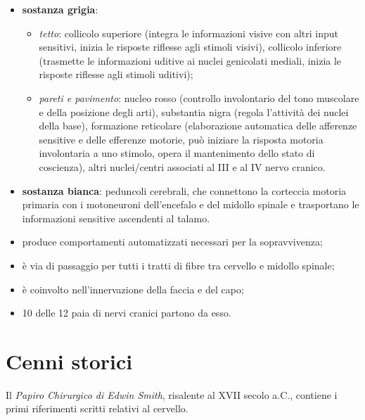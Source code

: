 \begin{itemize}
  \item \textbf{sostanza grigia}:
  \begin{itemize}
    \item \textit{tetto}: collicolo superiore (integra le informazioni
      visive con altri input sensitivi, inizia le risposte riflesse agli
      stimoli visivi), collicolo inferiore (trasmette le informazioni
      uditive ai nuclei genicolati mediali, inizia le risposte riflesse
      agli stimoli uditivi);
    \item \textit{pareti e pavimento}: nucleo rosso (controllo involontario
      del tono muscolare e della posizione degli arti), substantia nigra
      (regola l'attività dei nuclei della base), formazione reticolare
      (elaborazione automatica delle afferenze sensitive e delle efferenze
      motorie, può iniziare la risposta motoria involontaria a uno stimolo,
      opera il mantenimento dello stato di coscienza), altri nuclei/centri
      associati al III e al IV nervo cranico.
  \end{itemize}
  \item \textbf{sostanza bianca}: peduncoli cerebrali, che connettono la
    corteccia motoria primaria con i motoneuroni dell'encefalo e del midollo
    spinale e trasportano le informazioni sensitive ascendenti al talamo.
\end{itemize}

\begin{itemize}
  \item produce comportamenti automatizzati necessari per la sopravvivenza;
  \item è via di passaggio per tutti i tratti di fibre tra cervello e
    midollo spinale;
  \item è coinvolto nell'innervazione della faccia e del capo;
  \item 10 delle 12 paia di nervi cranici partono da esso.
\end{itemize}

\section{Cenni storici}

Il \textit{Papiro Chirurgico di Edwin Smith}, risalente al XVII secolo a.C.,
contiene i primi riferimenti scritti relativi al cervello.

